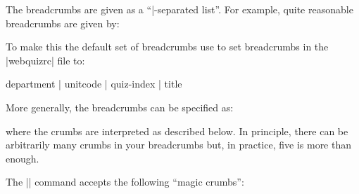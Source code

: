 \documentclass[svgnames]{article}
\newcommand\webquizrc{\index{webquizrc}\BashCode|webquizrc|\xspace}
\begin{document}
  The breadcrumbs are given as a ``|-separated list''. For example,
  quite reasonable breadcrumbs are given by:
  \begin{latexcode}
  \end{latexcode}
  To make this the default set of breadcrumbs use
   to set breadcrumbs
  in the \webquizrc file to:
  \begin{latexcode}
     department | unitcode | quiz-index | title
  \end{latexcode}
  More generally, the breadcrumbs can be specified as:
  \begin{latexcode}
  \end{latexcode}
  where the crumbs are interpreted as described below.
  In principle, there can be arbitrarily many crumbs in your
  breadcrumbs but, in practice, five is more than enough.

  The \LatexCode|\BreadCrumbs| command accepts the following ``magic crumbs'':
\end{document}
